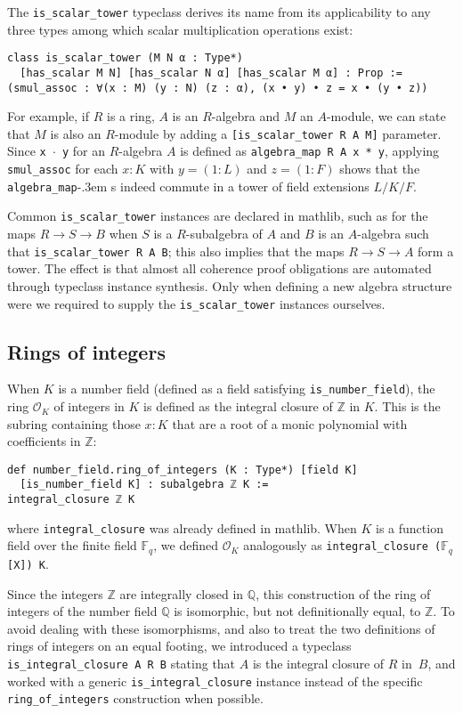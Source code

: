 \documentclass[sn-mathphys]{sn-jnl}%
\newcommand{\lean}[1]{\texttt{#1}\xspace}
\newcommand*{\OK}[1][K]{\mathcal{O}_{#1}}
\newcommand*{\Fq}[1][q]{\mathbb{F}_{#1}}
\newcommand{\mathlib}{\textsf{mathlib}\xspace}
\newcommand{\QQ}{\mathbb{Q}}
\renewcommand{\Z}{\mathbb{Z}}
\begin{document}
The \lean{is\_scalar\_tower} typeclass derives its name from its applicability to any three types among which scalar multiplication operations exist:
\begin{lstlisting}
class is_scalar_tower (M N α : Type*)
  [has_scalar M N] [has_scalar N α] [has_scalar M α] : Prop :=
(smul_assoc : ∀(x : M) (y : N) (z : α), (x • y) • z = x • (y • z))
\end{lstlisting}
For example, if $R$ is a ring, $A$ is an $R$-algebra and $M$ an $A$-module, we can state that $M$ is also an $R$-module by adding a \lean{[is\_scalar\_tower R A M]} parameter.
Since \lean{x~$\cdot$~y} for an $R$-algebra $A$ is defined as \lean{algebra\_map R A x * y}, applying \lean{smul\_assoc} for each $x : K$ with $y = (1 : L)$ and $z = (1 : F)$ shows that the \lean{algebra\_map}\kern-.3em s indeed commute in a tower of field extensions $L / K / F$.

Common \lean{is\_scalar\_tower} instances are declared in \mathlib,
such as for the maps $R \to S \to B$ when $S$ is a $R$-subalgebra of $A$ and $B$ is an $A$-algebra such that \lean{is\_scalar\_tower R A B};
this also implies that the maps $R \to S \to A$ form a tower.
The effect is that almost all coherence proof obligations are automated through typeclass instance synthesis.
Only when defining a new algebra structure were we required to supply the \lean{is\_scalar\_tower} instances ourselves.

\subsection{Rings of integers} \label{sec:ring-of-integers}

When $K$ is a number field (defined as a field satisfying \lean{is\_number\_field}), the ring $\OK$ of integers in $K$ is defined as the integral closure of $\Z$ in $K$.
This is the subring containing those $x : K$ that are a root of a monic polynomial with coefficients in $\Z$:
\begin{lstlisting}
def number_field.ring_of_integers (K : Type*) [field K]
  [is_number_field K] : subalgebra ℤ K :=
integral_closure ℤ K
\end{lstlisting}
where \lean{integral\_closure} was already defined in \mathlib.
When $K$ is a function field over the finite field $\Fq$, we defined $\OK$ analogously as \lean{integral\_closure ($\Fq$[X]) K}.

Since the integers $\Z$ are integrally closed in $\QQ$, this construction of the ring of integers of the number field $\QQ$ is isomorphic, but not definitionally equal, to $\Z$.
To avoid dealing with these isomorphisms, and also to treat the two definitions of rings of integers on an equal footing,
we introduced a typeclass \lean{is\_integral\_closure A R B} stating that $A$ is the integral closure of $R$ in~$B$,
and worked with a generic \lean{is\_integral\_closure} instance instead of the specific \lean{ring\_of\_integers} construction when possible.
\end{document}
